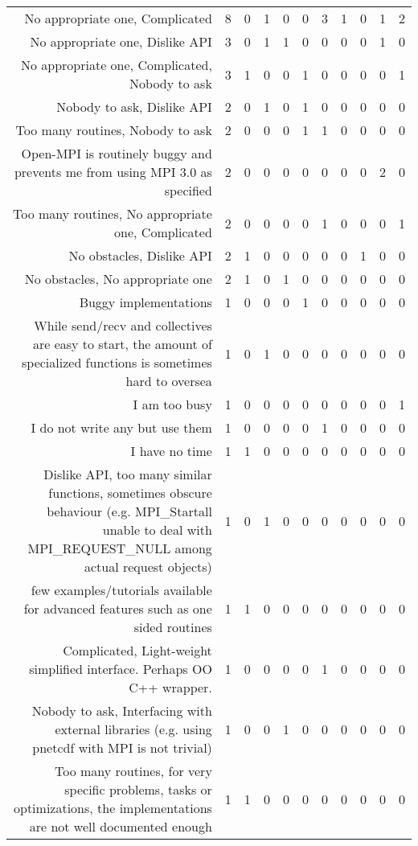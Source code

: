 {\begin{landscape}
\begin{longtable}[htb]{r|c|c|c|c|c|c|c|c|c|c}
{No appropriate one, Complicated} & 8 & 0 & 1 & 0 & 0 & 3 & 1 & 0 & 1 & 2 \\%
{No appropriate one, Dislike API} & 3 & 0 & 1 & 1 & 0 & 0 & 0 & 0 & 1 & 0 \\%
{No appropriate one, Complicated, Nobody to ask} & 3 & 1 & 0 & 0 & 1 & 0 & 0 & 0 & 0 & 1 \\%
{Nobody to ask, Dislike API} & 2 & 0 & 1 & 0 & 1 & 0 & 0 & 0 & 0 & 0 \\%
{Too many routines, Nobody to ask} & 2 & 0 & 0 & 0 & 1 & 1 & 0 & 0 & 0 & 0 \\%
{Open-MPI is routinely buggy and prevents me from using MPI 3.0 as specified} & 2 & 0 & 0 & 0 & 0 & 0 & 0 & 0 & 2 & 0 \\%
{Too many routines, No appropriate one, Complicated} & 2 & 0 & 0 & 0 & 0 & 1 & 0 & 0 & 0 & 1 \\%
{No obstacles, Dislike API} & 2 & 1 & 0 & 0 & 0 & 0 & 0 & 1 & 0 & 0 \\%
{No obstacles, No appropriate one} & 2 & 1 & 0 & 1 & 0 & 0 & 0 & 0 & 0 & 0 \\%
{Buggy implementations} & 1 & 0 & 0 & 0 & 1 & 0 & 0 & 0 & 0 & 0 \\%
{While send/recv and collectives are easy to start, the amount of specialized functions is sometimes hard to oversea} & 1 & 0 & 1 & 0 & 0 & 0 & 0 & 0 & 0 & 0 \\%
{I am too busy} & 1 & 0 & 0 & 0 & 0 & 0 & 0 & 0 & 0 & 1 \\%
{I do not write any but use them} & 1 & 0 & 0 & 0 & 0 & 1 & 0 & 0 & 0 & 0 \\%
{I have no time} & 1 & 1 & 0 & 0 & 0 & 0 & 0 & 0 & 0 & 0 \\%
{Dislike API, too many similar functions, sometimes obscure behaviour (e.g. MPI\_Startall unable to deal with MPI\_REQUEST\_NULL among actual request objects)} & 1 & 0 & 1 & 0 & 0 & 0 & 0 & 0 & 0 & 0 \\%
{few examples/tutorials available for advanced features such as one sided routines} & 1 & 1 & 0 & 0 & 0 & 0 & 0 & 0 & 0 & 0 \\%
{Complicated, Light-weight simplified interface. Perhaps OO C++ wrapper.} & 1 & 0 & 0 & 0 & 0 & 1 & 0 & 0 & 0 & 0 \\%
{Nobody to ask, Interfacing with external libraries (e.g. using pnetcdf with MPI is not trivial)} & 1 & 0 & 0 & 1 & 0 & 0 & 0 & 0 & 0 & 0 \\%
{Too many routines, for very specific problems, tasks or optimizations, the implementations are not well documented enough} & 1 & 1 & 0 & 0 & 0 & 0 & 0 & 0 & 0 & 0 \\%

\end{longtable}
\end{landscape}}

